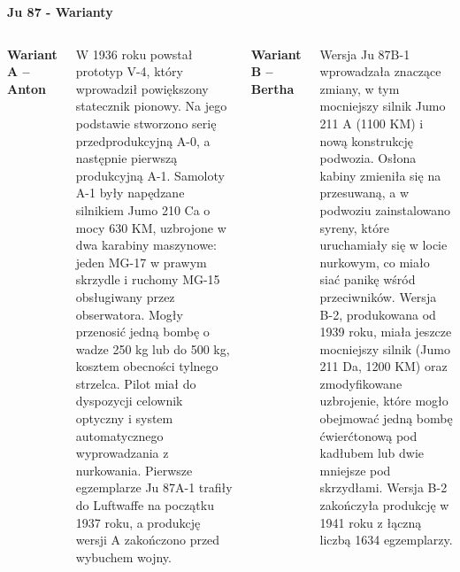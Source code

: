 \begin{frame}[t]{\Huge{\textbf{Ju 87 - Warianty}}}
	\begin{columns}[t]

{\large{\textbf{Wariant A – Anton}}}
	\justifying

W 1936 roku powstał prototyp V-4, który wprowadził powiększony statecznik pionowy. Na jego podstawie stworzono serię przedprodukcyjną A-0, a następnie pierwszą produkcyjną A-1. Samoloty A-1 były napędzane silnikiem Jumo 210 Ca o mocy 630 KM, uzbrojone w dwa karabiny maszynowe: jeden MG-17 w prawym skrzydle i ruchomy MG-15 obsługiwany przez obserwatora. Mogły przenosić jedną bombę o wadze 250 kg lub do 500 kg, kosztem obecności tylnego strzelca. Pilot miał do dyspozycji celownik optyczny i system automatycznego wyprowadzania z nurkowania. Pierwsze egzemplarze Ju 87A-1 trafiły do Luftwaffe na początku 1937 roku, a produkcję wersji A zakończono przed wybuchem wojny.


{\large{\textbf{Wariant B – Bertha}}}
	\justifying
	
Wersja Ju 87B-1 wprowadzała znaczące zmiany, w tym mocniejszy silnik Jumo 211 A (1100 KM) i nową konstrukcję podwozia. Osłona kabiny zmieniła się na przesuwaną, a w podwoziu zainstalowano syreny, które uruchamiały się w locie nurkowym, co miało siać panikę wśród przeciwników. Wersja B-2, produkowana od 1939 roku, miała jeszcze mocniejszy silnik (Jumo 211 Da, 1200 KM) oraz zmodyfikowane uzbrojenie, które mogło obejmować jedną bombę ćwierćtonową pod kadłubem lub dwie mniejsze pod skrzydłami. Wersja B-2 zakończyła produkcję w 1941 roku z łączną liczbą 1634 egzemplarzy. 

	\end{columns}
\end{frame}



